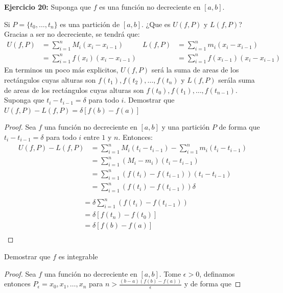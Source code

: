 \documentclass[../../main.tex]{subfiles}
\begin{document}
\question \textbf{Ejercicio 20:} Suponga que $f$ es una función no decreciente en $[a, b]$. 
\begin{partes}
    \parte Si $P = \{t_0, \dots, t_n\}$ es una partición de $[a, b]$. ¿Que es $U(f, P)$ y $L(f, P)$?\\
    Gracias a ser no decreciente, se tendrá que:
    \begin{align*}
        U(f, P) &= \sum_{i=1}^n M_i(x_i - x_{i-1}) & L(f, P) &= \sum_{i=1}^n m_i (x_i - x_{i-1})\\
        &= \sum_{i=1}^n f(x_i)(x_i - x_{i-1}) & &= \sum_{i=1}^n f(x_{i-1})(x_i-x_{i-1})
    \end{align*}
    En terminos un poco más explicitos, $U(f, P)$ será la suma de areas de los rectángulos cuyas alturas son
    $f(t_1), f(t_2), \dots, f(t_n)$ y $L(f, P)$ serála suma de areas de los rectángulos cuyas alturas son 
    $f(t_0), f(t_1), \dots, f(t_{n-1})$.
    \parte Suponga que $t_i - t_{i-1} = \delta$ para todo $i$. Demostrar que $U(f, P) - L(f, P) = \delta[f(b)-f(a)]$
    \begin{proof}
        Sea $f$ una función no decreciente en $[a, b]$ y una partición $P$ de forma que $t_i - t_{i-1} = \delta$ para todo $i$ entre $1$ y $n$.
        Entonces:
        \begin{align*}
            U(f, P) - L(f, P) &= \sum_{i = 1}^n M_i (t_i - t_{i-1}) - \sum_{i = 1}^n m_i(t_i - t_{i-1})\\
            &= \sum_{i = 1}^n (M_i - m_i)(t_i - t_{i-1})\\
            &= \sum_{i = 1}^n (f(t_i) - f(t_{i-1}))(t_i - t_{i-1})\\    
            &= \sum_{i = 1}^n (f(t_i) - f(t_{i-1})) \delta\\    
        \end{align*} 
        \begin{align*}
            &= \delta \sum_{i = 1}^n (f(t_i) - f(t_{i-1}))\\    
            &= \delta [f(t_n)-f(t_0)]\\ 
            &= \delta [f(b)-f(a)]\\   
        \end{align*}
    \end{proof}
    \parte Demostrar que $f$ es integrable
    \begin{proof}
        Sea $f$ una función no decreciente en $[a, b]$. Tome $\epsilon > 0$, definamos entonces $P_\epsilon = {x_0, x_1, \dots, x_n}$ para $n > \frac{(b-a)(f(b)-f(a))}{\epsilon}$ y de forma que

\end{proof}
\end{partes}
\end{document}
